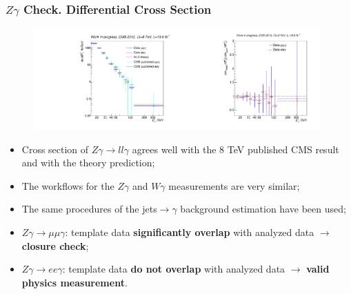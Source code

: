 \begin{frame}\frametitle{$Z\gamma$ Check. Differential Cross Section}
\begin{figure}[htb]
  \begin{center}
 \includegraphics[width=0.49\textwidth]{../figs/figs_v11/ChannelsMERGED_ZGamma/CrossSection/compareCSZGamma.pdf}\includegraphics[width=0.49\textwidth]{../figs/figs_v11/ChannelsMERGED_ZGamma/CrossSection/compareCSratioOttoZGamma.pdf}
  \end{center}
\end{figure}
  \tiny
  \begin{itemize}
    \item Cross section of $Z\gamma\rightarrow ll\gamma$ agrees well with the 8 TeV published CMS result and with the theory prediction;
     \item The workflows for the $Z\gamma$ and $W\gamma$ measurements are very similar;
     \item The same procedures of the jets$\rightarrow\gamma$ background estimation have been used;
     \item $Z\gamma\rightarrow\mu\mu\gamma$: template data {\bfseries{significantly overlap}} with analyzed data $\rightarrow$ {\bfseries{closure check}};
     \item $Z\gamma\rightarrow ee\gamma$: template data {\bfseries{do not overlap}} with analyzed data $\rightarrow$ {\bfseries{valid physics measurement}}.
   \end{itemize}
\end{frame}%
